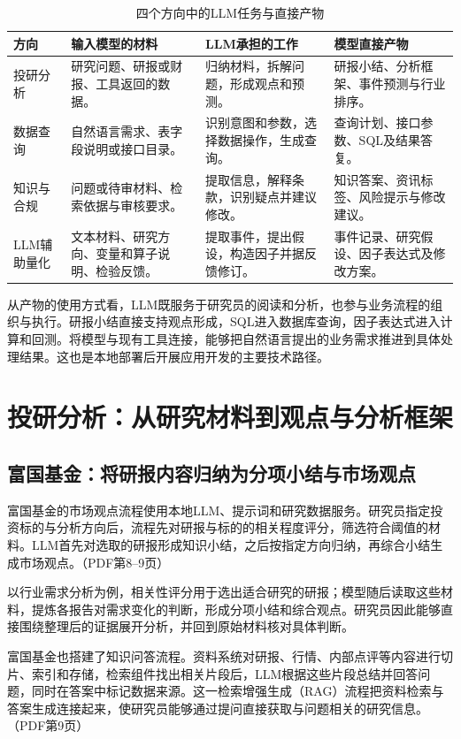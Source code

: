\documentclass[11pt,a4paper,fontset=none]{ctexart}
\begin{document}
\begin{table}[H]\small\centering
\caption{四个方向中的LLM任务与直接产物}\label{tab:roles}
\begin{tabularx}{\linewidth}{@{}P{23mm}Y Y Y@{}}\toprule
方向 & 输入模型的材料 & LLM承担的工作 & 模型直接产物\\\midrule
投研分析 & 研究问题、研报或财报、工具返回的数据。 & 归纳材料，拆解问题，形成观点和预测。 & 研报小结、分析框架、事件预测与行业排序。\\
数据查询 & 自然语言需求、表字段说明或接口目录。 & 识别意图和参数，选择数据操作，生成查询。 & 查询计划、接口参数、SQL及结果答复。\\
知识与合规 & 问题或待审材料、检索依据与审核要求。 & 提取信息，解释条款，识别疑点并建议修改。 & 知识答案、资讯标签、风险提示与修改建议。\\
LLM辅助量化 & 文本材料、研究方向、变量和算子说明、检验反馈。 & 提取事件，提出假设，构造因子并据反馈修订。 & 事件记录、研究假设、因子表达式及修改方案。\\\bottomrule
\end{tabularx}
\end{table}

从产物的使用方式看，LLM既服务于研究员的阅读和分析，也参与业务流程的组织与执行。研报小结直接支持观点形成，SQL进入数据库查询，因子表达式进入计算和回测。将模型与现有工具连接，能够把自然语言提出的业务需求推进到具体处理结果。这也是本地部署后开展应用开发的主要技术路径。
\clearpage

\section{投研分析：从研究材料到观点与分析框架}
\subsection{富国基金：将研报内容归纳为分项小结与市场观点}
富国基金的市场观点流程使用本地LLM、提示词和研究数据服务。研究员指定投资标的与分析方向后，流程先对研报与标的的相关程度评分，筛选符合阈值的材料。LLM首先对选取的研报形成知识小结，之后按指定方向归纳，再综合小结生成市场观点。（PDF第8--9页）

以行业需求分析为例，相关性评分用于选出适合研究的研报；模型随后读取这些材料，提炼各报告对需求变化的判断，形成分项小结和综合观点。研究员因此能够直接围绕整理后的证据展开分析，并回到原始材料核对具体判断。

富国基金也搭建了知识问答流程。资料系统对研报、行情、内部点评等内容进行切片、索引和存储，检索组件找出相关片段后，LLM根据这些片段总结并回答问题，同时在答案中标记数据来源。这一检索增强生成（RAG）流程把资料检索与答案生成连接起来，使研究员能够通过提问直接获取与问题相关的研究信息。（PDF第9页）
\end{document}
